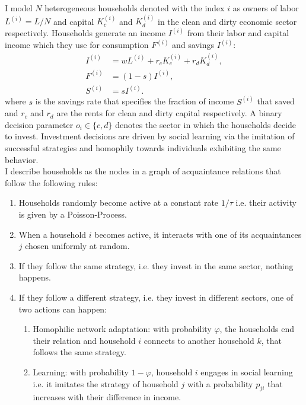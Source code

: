 I model $N$ heterogeneous households denoted with the index $i$ as owners of labor $L^{(i)} = L/N$ and capital $K_c^{(i)}$ and $K_d^{(i)}$ in the clean and dirty economic sector respectively.
Households generate an income $I^{(i)}$ from their labor and capital income which they use for consumption $F^{(i)}$ and savings $I^{(i)}$:
\begin{align} 
	I^{(i)} &= w L^{(i)} + r_c K_c^{(i)} + r_d K_d^{(i)}, \label{eq:approx_hi} \\
	F^{(i)} &= (1-s) I^{(i)}, \label{eq:approx_c} \\
	S^{(i)} &= s I^{(i)}. \label{eq:approx_s}
\end{align}
where $s$ is the savings rate that specifies the fraction of income $S^{(i)}$ that saved and $r_c$ and $r_d$ are the rents for clean and dirty capital respectively.
A binary decision parameter $o_i \in \{c,d\}$ denotes the sector in which the households decide to invest. Investment decisions are driven by social learning via the imitation of successful strategies and homophily towards individuals exhibiting the same behavior. \\
I describe households as the nodes in a graph of acquaintance relations that follow the following rules: 
\begin{enumerate}
    \item Households randomly become active at a constant rate $1/\tau$ i.e. their activity is given by a Poisson-Process. \label{r1}
        \item When a household $i$ becomes active, it interacts with one of its acquaintances $j$ chosen uniformly at random. 
        \item If they follow the same strategy, i.e. they invest in the same sector, nothing happens. 
        \item If they follow a different strategy, i.e. they invest in different sectors, one of two actions can happen:
        \begin{enumerate}
                \item Homophilic network adaptation: with probability $\varphi$, the households end their relation and household $i$ connects to another household $k$, that follows the same strategy. 
                \item Learning: with probability $1-\varphi$, household $i$ engages in social learning i.e. it imitates the strategy of household $j$ with a probability $p_{ji}$ that increases with their difference in income. \label{rn}
        \end{enumerate}
\end{enumerate}
